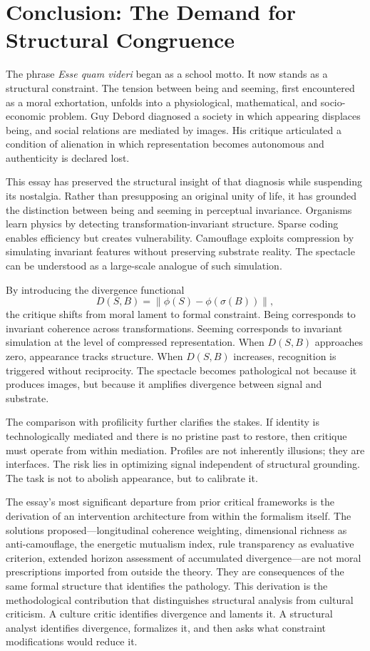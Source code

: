 \documentclass[11pt]{article}
\begin{document}
\section{Conclusion: The Demand for Structural Congruence}

The phrase \textit{Esse quam videri} began as a school motto. It now stands as a structural constraint. The tension between being and seeming, first encountered as a moral exhortation, unfolds into a physiological, mathematical, and socio-economic problem. Guy Debord diagnosed a society in which appearing displaces being, and social relations are mediated by images. His critique articulated a condition of alienation in which representation becomes autonomous and authenticity is declared lost.

This essay has preserved the structural insight of that diagnosis while suspending its nostalgia. Rather than presupposing an original unity of life, it has grounded the distinction between being and seeming in perceptual invariance. Organisms learn physics by detecting transformation-invariant structure. Sparse coding enables efficiency but creates vulnerability. Camouflage exploits compression by simulating invariant features without preserving substrate reality. The spectacle can be understood as a large-scale analogue of such simulation.

By introducing the divergence functional
\[
D(S,B) = \|\phi(S) - \phi(\sigma(B))\|,
\]
the critique shifts from moral lament to formal constraint. Being corresponds to invariant coherence across transformations. Seeming corresponds to invariant simulation at the level of compressed representation. When $D(S,B)$ approaches zero, appearance tracks structure. When $D(S,B)$ increases, recognition is triggered without reciprocity. The spectacle becomes pathological not because it produces images, but because it amplifies divergence between signal and substrate.

The comparison with profilicity further clarifies the stakes. If identity is technologically mediated and there is no pristine past to restore, then critique must operate from within mediation. Profiles are not inherently illusions; they are interfaces. The risk lies in optimizing signal independent of structural grounding. The task is not to abolish appearance, but to calibrate it.

The essay's most significant departure from prior critical frameworks is the derivation of an intervention architecture from within the formalism itself. The solutions proposed---longitudinal coherence weighting, dimensional richness as anti-camouflage, the energetic mutualism index, rule transparency as evaluative criterion, extended horizon assessment of accumulated divergence---are not moral prescriptions imported from outside the theory. They are consequences of the same formal structure that identifies the pathology. This derivation is the methodological contribution that distinguishes structural analysis from cultural criticism. A culture critic identifies divergence and laments it. A structural analyst identifies divergence, formalizes it, and then asks what constraint modifications would reduce it.
\end{document}
